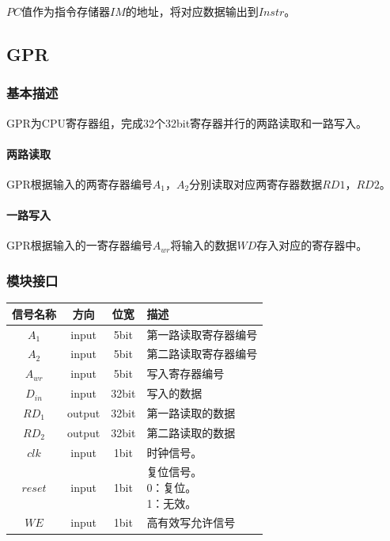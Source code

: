 \documentclass[main.tex]{subfiles}
\begin{document}
$PC$值作为指令存储器$IM$的地址，将对应数据输出到$Instr$。

\clearpage
\subsection{GPR}
\subsubsection{基本描述}
GPR为CPU寄存器组，完成$32$个32bit寄存器并行的两路读取和一路写入。
\paragraph{两路读取}
GPR根据输入的两寄存器编号$A_1$，$A_2$分别读取对应两寄存器数据$RD1$，$RD2$。
\paragraph{一路写入}
GPR根据输入的一寄存器编号$A_{wr}$将输入的数据$WD$存入对应的寄存器中。

\subsubsection{模块接口}
\begin{center}
    \begin{tabular}{c c c l}
        \toprule
        信号名称 & 方向 & 位宽 & 描述 \\
        \midrule
        $A_1$ & input & 5bit & 第一路读取寄存器编号 \\
        $A_2$ & input & 5bit & 第二路读取寄存器编号 \\
        $A_{wr}$ & input & 5bit & 写入寄存器编号 \\
        $D_{in}$ & input & 32bit & 写入的数据 \\
        $RD_1$ & output & 32bit & 第一路读取的数据 \\
        $RD_2$ & output & 32bit & 第二路读取的数据 \\
        \midrule
        $clk$ & input & 1bit & 时钟信号。\\
        $reset$ & input & 1bit & \makecell[lt]{
            复位信号。\\
             0：复位。\\
             1：无效。
        } \\
        $WE$ & input & 1bit & 高有效写允许信号 \\
        \bottomrule
    \end{tabular}
\end{center}
\end{document}
